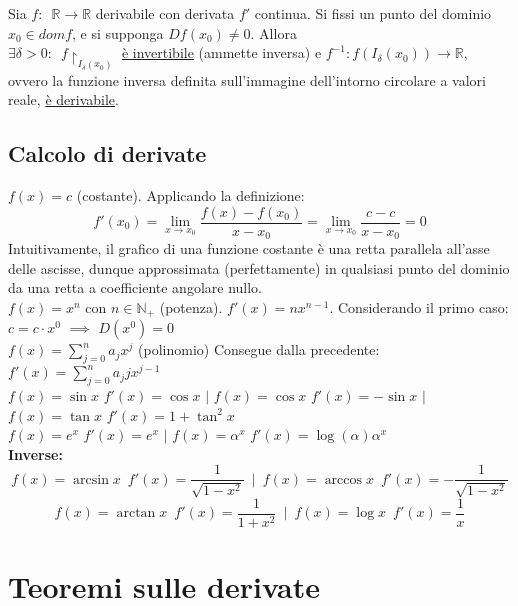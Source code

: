 \documentclass[10pt, oneside]{book}
\theoremstyle{plain}
\begin{document}
\begin{ther}
Sia $f : \enspace \mathbb{R} \rightarrow \mathbb{R}$ derivabile con derivata $f'$ continua. Si fissi un punto del dominio $x_0 \in dom f$, e si supponga $D f (x_0) \neq 0$. Allora\\
$\exists \delta > 0 : \enspace f\restriction_{I_\delta(x_0)}$ \underline{è invertibile} (ammette inversa) e $f^{-1} : f( I_\delta(x_0)) \rightarrow \mathbb{R}$, ovvero la funzione inversa definita sull'immagine dell'intorno circolare a valori reale, \underline{è derivabile}.
\end{ther}

\section{Calcolo di derivate}
$f(x) = c$ (costante). Applicando la definizione:
    \[f'(x_0) = \lim \limits_{x \rightarrow x_0} \frac{f(x) - f(x_0)}{x - x_0} = \lim \limits_{x \rightarrow x_0} \frac{c - c}{x - x_0} = 0\]
    Intuitivamente, il grafico di una funzione costante è una retta parallela all'asse delle ascisse, dunque approssimata (perfettamente) in qualsiasi punto del dominio da una retta a coefficiente angolare nullo.
    \\$f(x) = x^n$ con $n \in \mathbb{N}_+$ (potenza). $f'(x) = n x^{n-1}$. Considerando il primo caso: $c = c \cdot x^0$ $\implies$ $D(x^0) = 0$
    \\$f(x) = \sum \limits_{j = 0}^{n} a_j x^j$ (polinomio) Consegue dalla precedente: $f'(x) = \sum \limits_{j = 0}^{n} a_j j x^{j-1}$
    \\$f(x) = \sin x$ $f'(x) = \cos x$ $\bigg|$ $f(x) = \cos x$ $f'(x) = -\sin x$ $\bigg|$ $f(x) = \tan x$ $f'(x) = 1 + \tan^2 x$
    \\$f(x) = e^x$ $f'(x) = e^x$ $\bigg|$ $f(x) = \alpha^x$ $f'(x) = \log(\alpha) \alpha^x$
    \\\textbf{Inverse:}
    \[f(x) = \arcsin x \enspace f'(x) = \frac{1}{\sqrt{1 - x^2}} \enspace \bigg| \enspace f(x) = \arccos x \enspace f'(x) = - \frac{1}{\sqrt{1 - x^2}}\]
    \[f(x) = \arctan x \enspace f'(x) = \frac{1}{1 + x^2} \enspace \bigg| \enspace f(x) = \log x \enspace f'(x) = \frac{1}{x}\]


\chapter{Teoremi sulle derivate}
\end{document}

